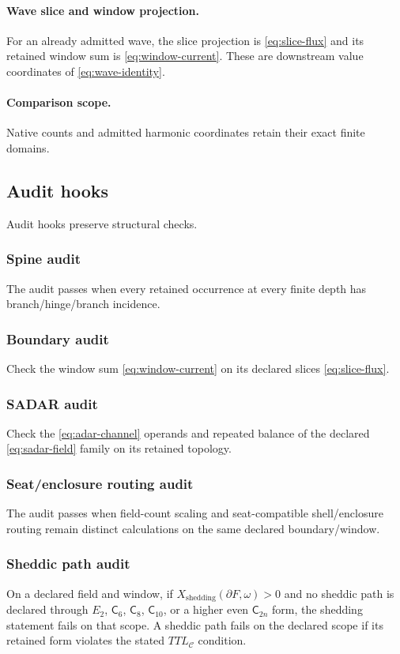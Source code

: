 \paragraph{Wave slice and window projection.}
For an already admitted wave, the slice projection is \eqref{eq:slice-flux}
and its retained window sum is \eqref{eq:window-current}. These are downstream
value coordinates of \eqref{eq:wave-identity}.
\paragraph{Comparison scope.}\label{subsec:external-comparison-quarantine}
Native counts and admitted harmonic coordinates retain their exact finite
domains.

\subsection{Audit hooks}
\label{sec:audit-hooks}
Audit hooks preserve structural checks.

\subsubsection{Spine audit}\label{subsec:spine-audit}
The audit passes when every retained occurrence at every finite depth has branch/hinge/branch incidence.

\subsubsection{Boundary audit}\label{subsec:boundary-audit}
Check the window sum \eqref{eq:window-current} on its declared slices
\eqref{eq:slice-flux}.

\subsubsection{SADAR audit}\label{subsec:sadar-audit}
Check the \eqref{eq:adar-channel} operands and repeated balance of the declared
\eqref{eq:sadar-field} family on its retained topology.

\subsubsection{Seat/enclosure routing audit}\label{subsec:support-enclosure-audit}
The audit passes when field-count scaling and seat-compatible shell/enclosure routing remain distinct calculations on the same declared boundary/window.

\subsubsection{Sheddic path audit}\label{subsec:sheddic-path-audit}
On a declared field and window, if \(X_{\mathrm{shedding}}(\partial F,\omega)>0\) and no sheddic path is declared through \(E_2\), \(\mathsf C_6\), \(\mathsf C_8\), \(\mathsf C_{10}\), or a higher even \(\mathsf C_{2n}\) form, the shedding statement fails on that scope. A sheddic path fails on the declared scope if its retained form violates the stated \(TTL_{\mathcal C}\) condition.



